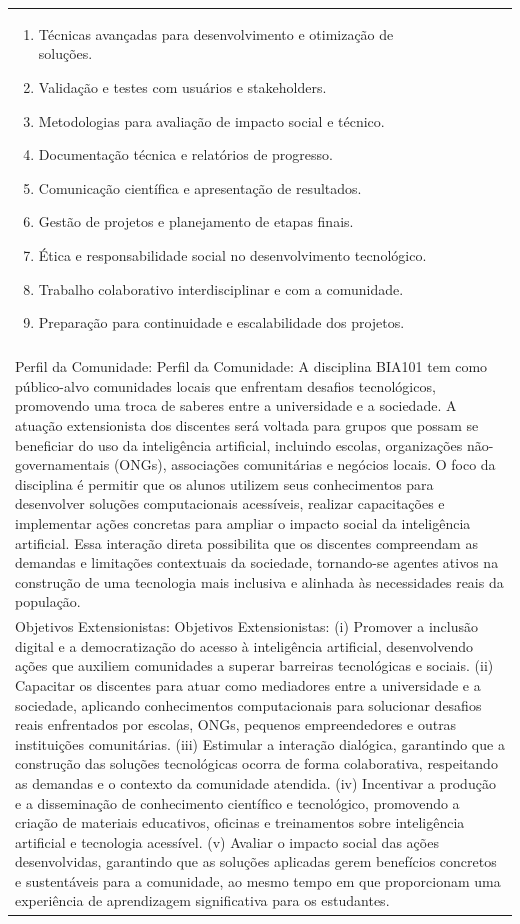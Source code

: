 \documentclass[11pt]{article}
\begin{document}
\begin{center}
\begin{longtable}{|p{4cm}|p{4cm}|p{4cm}|p{4cm}|}
{\begin{enumerate}
\item Técnicas avançadas para desenvolvimento e otimização de soluções.
\item Validação e testes com usuários e stakeholders.
\item Metodologias para avaliação de impacto social e técnico.
\item Documentação técnica e relatórios de progresso.
\item Comunicação científica e apresentação de resultados.
\item Gestão de projetos e planejamento de etapas finais.
\item Ética e responsabilidade social no desenvolvimento tecnológico.
\item Trabalho colaborativo interdisciplinar e com a comunidade.
\item Preparação para continuidade e escalabilidade dos projetos.\end{enumerate}}\\
\multicolumn{4}{|p{16cm}|}{}\\
\multicolumn{4}{|p{16cm}|}{Perfil da Comunidade: Perfil da Comunidade: A disciplina BIA101 tem como público-alvo comunidades locais que enfrentam desafios tecnológicos, promovendo uma troca de saberes entre a universidade e a sociedade. A atuação extensionista dos discentes será voltada para grupos que possam se beneficiar do uso da inteligência artificial, incluindo escolas, organizações não-governamentais (ONGs), associações comunitárias e negócios locais. O foco da disciplina é permitir que os alunos utilizem seus conhecimentos para desenvolver soluções computacionais acessíveis, realizar capacitações e implementar ações concretas para ampliar o impacto social da inteligência artificial. Essa interação direta possibilita que os discentes compreendam as demandas e limitações contextuais da sociedade, tornando-se agentes ativos na construção de uma tecnologia mais inclusiva e alinhada às necessidades reais da população.}\\
\multicolumn{4}{|p{16cm}|}{Objetivos Extensionistas: Objetivos Extensionistas: (i) Promover a inclusão digital e a democratização do acesso à inteligência artificial, desenvolvendo ações que auxiliem comunidades a superar barreiras tecnológicas e sociais. (ii) Capacitar os discentes para atuar como mediadores entre a universidade e a sociedade, aplicando conhecimentos computacionais para solucionar desafios reais enfrentados por escolas, ONGs, pequenos empreendedores e outras instituições comunitárias. (iii) Estimular a interação dialógica, garantindo que a construção das soluções tecnológicas ocorra de forma colaborativa, respeitando as demandas e o contexto da comunidade atendida. (iv) Incentivar a produção e a disseminação de conhecimento científico e tecnológico, promovendo a criação de materiais educativos, oficinas e treinamentos sobre inteligência artificial e tecnologia acessível. (v) Avaliar o impacto social das ações desenvolvidas, garantindo que as soluções aplicadas gerem benefícios concretos e sustentáveis para a comunidade, ao mesmo tempo em que proporcionam uma experiência de aprendizagem significativa para os estudantes.}\\

\end{longtable}
\end{center}
\end{document}
